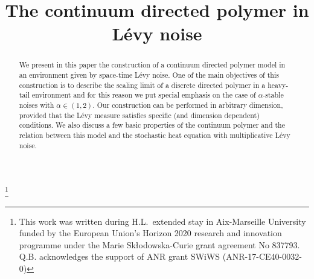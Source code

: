 \documentclass[JEP,XML,SOM,Unicode,published]{cedram}
\theoremstyle{definition}
\begin{document}
\title{The continuum directed polymer in Lévy noise}

\author[\initial{Q.} \lastname{Berger}]{ }
\address{LPSM, Sorbonne Université, UMR 8001\\
Campus Pierre et Marie Curie, Boîte courrier 158, 4 Place Jussieu, 75252 Paris Cedex 05, France}

\author[\initial{H.} \lastname{Lacoin}]{ }
\address{IMPA, Institudo de Matemática Pura e Aplicada\\
Estrada Dona Castorina 110, Rio de Janeiro, CEP-22460-320, Brasil}
\urladdr{}

\thanks{This work was written during H.L.\ extended stay in Aix-Marseille University funded by the European Union’s Horizon 2020 research and innovation programme under the Marie Skłodowska-Curie grant agreement No 837793. Q.B. acknowledges the support of ANR grant SWiWS (ANR-17-CE40-0032-0)}



\begin{abstract}
We present in this paper the construction of a continuum directed polymer model in an environment given by space-time Lévy noise. One of the main objectives of this construction is to describe the scaling limit of a discrete directed polymer in a heavy-tail environment and for this reason we put special emphasis on the case of $\alpha$-stable noises with $\alpha \in (1,2)$. Our construction can be performed in arbitrary dimension, provided that the Lévy measure satisfies specific (and dimension dependent) conditions. We also discuss a few basic properties of the continuum polymer and the relation between this model and the stochastic heat equation with multiplicative Lévy noise.
\end{abstract}


\end{document}
